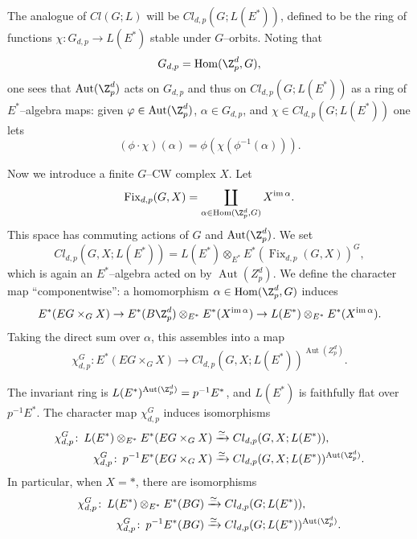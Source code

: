 The analogue of $Cl(G; L)$ will be $Cl_{d,p}(G; L(E^*))$, defined to be the ring of functions $\chi: G_{d, p} \to L(E^*)$ stable under $G$--orbits.  Noting that \[G_{d,p} = \operatorname{Hom}(\Z_p^d, G),\] one sees that $\operatorname{Aut}(\Z_p^d)$ acts on $G_{d,p}$ and thus on $Cl_{d,p}(G; L(E^*))$ as a ring of $E^*$--algebra maps: given $\phi \in \operatorname{Aut}(\Z_p^d)$, $\alpha \in G_{d,p}$, and $\chi \in Cl_{d,p}(G; L(E^*))$ one lets \[(\phi \cdot \chi)(\alpha) = \phi(\chi(\phi^{-1}(\alpha))).\]

Now we introduce a finite $G$--CW complex $X$.  Let \[\operatorname{Fix}_{d, p}(G, X) = \coprod_{\alpha \in \operatorname{Hom}(\Z_p^d, G)} X^{\operatorname{im} \alpha}.\]  This space has commuting actions of $G$ and $\operatorname{Aut}(\Z_p^d)$.  We set \[Cl_{d, p}(G, X; L(E^*)) = L(E^*) \otimes_{E^*} E^*(\operatorname{Fix}_{d,p}(G, X))^G,\] which is again an $E^*$--algebra acted on by $\operatorname{Aut}(Z_p^d)$.  We define the character map ``componentwise'': a homomorphism $\alpha \in \operatorname{Hom}(\Z_p^d, G)$ induces \[E^*(EG \times_G X) \to E^*(B\Z_p^d) \otimes_{E^*} E^*(X^{\operatorname{im} \alpha}) \to L(E^*) \otimes_{E^*} E^*(X^{\operatorname{im} \alpha}).\]  Taking the direct sum over $\alpha$, this assembles into a map \[\chi_{d,p}^G: E^*(EG \times_G X) \to Cl_{d,p}(G, X; L(E^*))^{\operatorname{Aut}(Z_p^d)}.\]
\begin{theorem}
The invariant ring is $L(E^*)^{\operatorname{Aut}(\Z_p^d)} = p^{-1} E^*$, and $L(E^*)$ is faithfully flat over $p^{-1} E^*$.  The character map $\chi_{d,p}^G$ induces isomorphisms
\begin{align*}
\chi_{d,p}^G \co L(E^*) \otimes_{E^*} E^*(EG \times_G X) & \xrightarrow{\simeq} Cl_{d,p}(G, X; L(E^*)), \\
\chi_{d,p}^G \co p^{-1} E^*(EG \times_G X) & \xrightarrow{\simeq} Cl_{d,p}(G, X; L(E^*))^{\operatorname{Aut}(\Z_p^d)}.
\end{align*}
In particular, when $X = *$, there are isomorphisms
\begin{align*}
\chi_{d,p}^G \co L(E^*) \otimes_{E^*} E^*(BG) & \xrightarrow{\simeq} Cl_{d,p}(G; L(E^*)), \\
\chi_{d,p}^G \co p^{-1} E^*(BG) & \xrightarrow{\simeq} Cl_{d,p}(G; L(E^*))^{\operatorname{Aut}(\Z_p^d)}. \qed
\end{align*}
\end{theorem}

